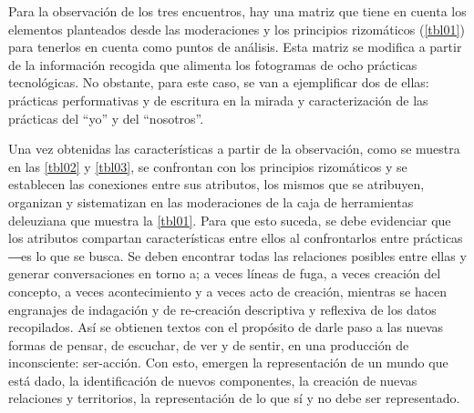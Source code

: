 \documentclass{textolivre}
\begin{document}
Para la observación de los tres encuentros, hay una matriz que tiene en cuenta los elementos planteados desde las moderaciones y los principios rizomáticos (\cref{tbl01}) para tenerlos en cuenta como puntos de análisis. Esta matriz se modifica a partir de la información recogida que alimenta los fotogramas de ocho prácticas tecnológicas. No obstante, para este caso, se van a ejemplificar dos de ellas: prácticas performativas y de escritura en la mirada y caracterización de las prácticas del “yo” y del “nosotros”.

Una vez obtenidas las características a partir de la observación, como se muestra en las \cref{tbl02} y \cref{tbl03}, se confrontan con los principios rizomáticos y se establecen las conexiones entre sus atributos, los mismos que se atribuyen, organizan y sistematizan en las moderaciones de la caja de herramientas deleuziana que muestra la \cref{tbl01}. Para que esto suceda, se debe evidenciar que los atributos compartan características entre ellos al confrontarlos entre prácticas ―es lo que se busca. Se deben encontrar todas las relaciones posibles entre ellas y generar conversaciones en torno a; a veces líneas de fuga, a veces creación del concepto, a veces acontecimiento y a veces acto de creación, mientras se hacen engranajes de indagación y de re-creación descriptiva y reflexiva de los datos recopilados. Así se obtienen textos con el propósito de darle paso a las nuevas formas de pensar, de escuchar, de ver y de sentir, en una producción de inconsciente: ser-acción. Con esto, emergen la representación de un mundo que está dado, la identificación de nuevos componentes, la creación de nuevas relaciones y territorios, la representación de lo que sí y no debe ser representado.
\end{document}

